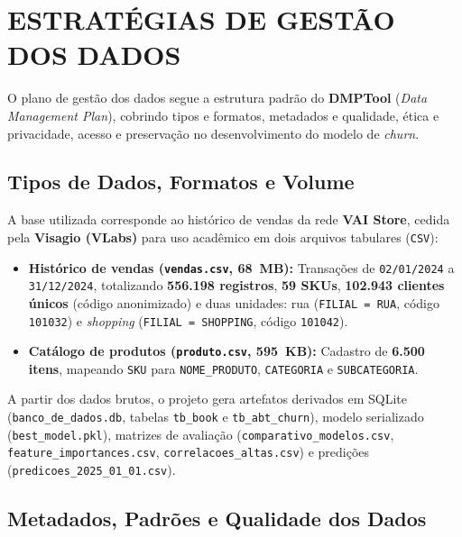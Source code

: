 \section{ESTRATÉGIAS DE GESTÃO DOS DADOS}\label{sec:conteudo1}

\begin{sloppypar}
O plano de gestão dos dados segue a estrutura padrão do \textbf{DMPTool} (\textit{Data Management Plan}), cobrindo tipos e formatos, metadados e qualidade, ética e privacidade, acesso e preservação no desenvolvimento do modelo de \textit{churn}.

\subsection{Tipos de Dados, Formatos e Volume}\label{subsec:tipos_formatos}

A base utilizada corresponde ao histórico de vendas da rede \textbf{VAI Store}, cedida pela \textbf{Visagio (VLabs)} para uso acadêmico em dois arquivos tabulares (\texttt{CSV}):
\begin{itemize}[leftmargin=*]
    \item \textbf{Histórico de vendas (\texttt{vendas.csv}, 68~MB):} Transações de \texttt{02/01/2024} a \texttt{31/12/2024}, totalizando \textbf{556.198 registros}, \textbf{59 SKUs}, \textbf{102.943 clientes únicos} (código anonimizado) e duas unidades: rua (\texttt{FILIAL = RUA}, código \texttt{101032}) e \textit{shopping} (\texttt{FILIAL = SHOPPING}, código \texttt{101042}).
    \item \textbf{Catálogo de produtos (\texttt{produto.csv}, 595~KB):} Cadastro de \textbf{6.500 itens}, mapeando \texttt{SKU} para \texttt{NOME\_PRODUTO}, \texttt{CATEGORIA} e \texttt{SUBCATEGORIA}.
\end{itemize}

A partir dos dados brutos, o projeto gera artefatos derivados em SQLite (\texttt{banco\_de\_dados.db}, tabelas \texttt{tb\_book} e \texttt{tb\_abt\_churn}), modelo serializado (\texttt{best\_model.pkl}), matrizes de avaliação (\texttt{comparativo\_modelos.csv}, \texttt{feature\_importances.csv}, \texttt{correlacoes\_altas.csv}) e predições (\texttt{predicoes\_2025\_01\_01.csv}).

\subsection{Metadados, Padrões e Qualidade dos Dados}\label{subsec:metadados_qualidade}


\end{sloppypar}
